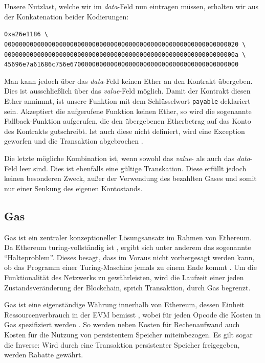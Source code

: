 \documentclass[runningheads]{llncs}
\begin{document}
Unsere Nutzlast, welche wir im \textit{data}-Feld nun eintragen müssen, erhalten wir aus der Konkatenation beider Kodierungen:

\begingroup
\fontsize{9pt}{10pt}\selectfont
\begin{center}
  \texttt{0xa26e1186 \textbackslash} \\
  \texttt{0000000000000000000000000000000000000000000000000000000000000020 \textbackslash} \\
  \texttt{000000000000000000000000000000000000000000000000000000000000000a \textbackslash} \\
  \texttt{45696e7a61686c756e6700000000000000000000000000000000000000000000}
\end{center}
\endgroup

Man kann jedoch über das \textit{data}-Feld keinen Ether an den Kontrakt übergeben. Dies ist ausschließlich über das \textit{value}-Feld möglich. Damit der Kontrakt diesen Ether annimmt, ist unsere Funktion mit dem Schlüsselwort \texttt{payable} deklariert sein. Akzeptiert die aufgerufene Funktion keinen Ether, so wird die sogenannte Fallback-Funktion aufgerufen, die den übergebenen Etherbetrag auf das Konto des Kontrakts gutschreibt. Ist auch diese nicht definiert, wird eine Exception geworfen und die Transaktion abgebrochen \cite{noauthor_contract_nodate}.

Die letzte mögliche Kombination ist, wenn sowohl das \textit{value}- als auch das \textit{data}-Feld leer sind. Dies ist ebenfalls eine gültige Transkation. Diese erfüllt jedoch keinen besonderen Zweck, außer der Verwendung des bezahlten Gases und somit nur einer Senkung des eigenen Kontostands.

\subsection{Gas}
\label{gas}
Gas ist ein zentraler konzeptioneller Lösungsansatz im Rahmen von Ethereum. Da Ethereum turing-vollständig ist \cite[S. 1]{wood_ethereum/yellowpaper_2019}, ergibt sich unter anderem das sogenannte "`Halteproblem"'. Dieses besagt, dass im Voraus nicht vorhergesagt werden kann, ob das Programm einer Turing-Maschine jemals zu einem Ende kommt \cite[S.70]{davis_computability_2013}. Um die Funktionalität des Netzwerks zu gewährleisten, wird die Laufzeit einer jeden Zustandsveränderung der Blockchain, sprich Transaktion, durch Gas begrenzt.

Gas ist eine eigenständige Währung innerhalb von Ethereum, dessen Einheit Ressourcenverbrauch in der EVM bemisst \cite[S. 9:3]{m.spain_oasics-tokeneconomics_2019}, wobei für jeden Opcode die Kosten in Gas spezifiziert werden \cite[S. 25 ff.]{wood_ethereum/yellowpaper_2019}. So werden neben Kosten für Rechenaufwand auch Kosten für die Nutzung von persistentem Speicher miteinbezogen. Es gilt sogar die Inverse: Wird durch eine Transaktion persistenter Speicher freigegeben, werden Rabatte gewährt.
\end{document}
